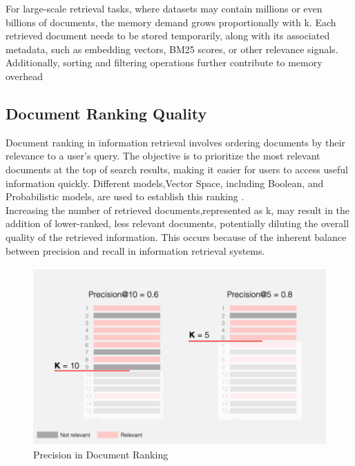 For large-scale retrieval tasks, where datasets may contain millions or even billions of documents, the memory demand grows proportionally with 
k. Each retrieved document needs to be stored temporarily, along with its associated metadata, such as embedding vectors, BM25 scores, or other relevance signals. Additionally, sorting and filtering operations further contribute to memory overhead
\subsection{Document Ranking Quality}
Document ranking in information retrieval involves ordering documents by their relevance to a user's query. The objective is to prioritize the most relevant documents at the top of search results, making it easier for users to access useful information quickly. Different models,Vector Space, including Boolean, and Probabilistic models, are used to establish this ranking \cite{enwiki:1262179867}.\\

Increasing the number of retrieved documents,represented as k, may result in the addition of lower-ranked, less relevant documents, potentially diluting the overall quality of the retrieved information. This occurs because of the inherent balance between precision and recall in information retrieval systems.
\begin{figure}[h]
	\centering
	\includegraphics[width=0.7\linewidth]{Figures/precisionR.png}
	\caption{Precision in Document Ranking\cite{evidentlyai2025}}
	\label{precisionR}
	
\end{figure}

